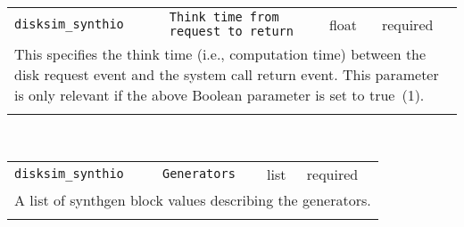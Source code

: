 \noindent 
\begin{tabular}{|p{1.5in}|p{3.5in}|p{0.5in}|p{0.5in}|}
\cline{1-4}
\texttt{disksim\_synthio} & \texttt{Think time from request to return} & float & required \\ 
\cline{1-4}
\multicolumn{4}{|p{6in}|}{
This specifies the think time (i.e., computation time) between the disk
request event and the system call return event. This parameter is
only relevant if the above Boolean parameter is set to true~(1).
}\\ 
\cline{1-4}
\multicolumn{4}{p{5in}}{}\\
\end{tabular}\\ 
\noindent 
\begin{tabular}{|p{1.5in}|p{3.5in}|p{0.5in}|p{0.5in}|}
\cline{1-4}
\texttt{disksim\_synthio} & \texttt{Generators} & list & required \\ 
\cline{1-4}
\multicolumn{4}{|p{6in}|}{
A list of synthgen block values describing the generators.
}\\ 
\cline{1-4}
\multicolumn{4}{p{5in}}{}\\
\end{tabular}\\ 
